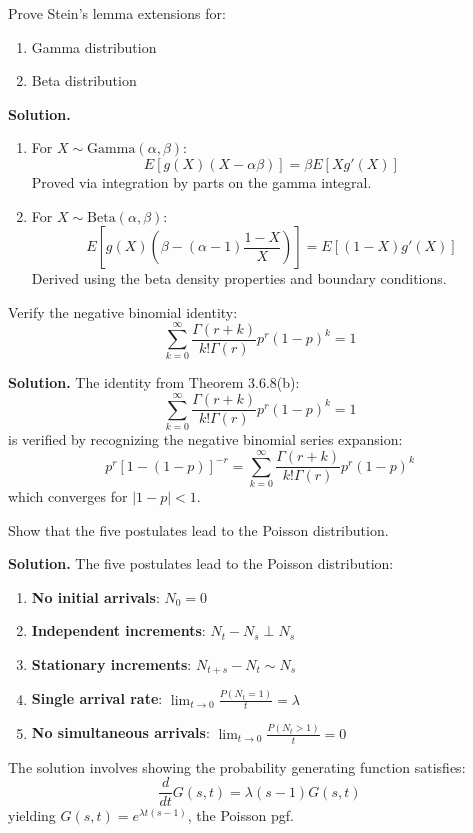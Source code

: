 \begin{problembox}
Prove Stein's lemma extensions for:
\begin{enumerate}[label=(\alph*)]
\item Gamma distribution
\item Beta distribution
\end{enumerate}
\end{problembox}

\noindent\textbf{Solution.}
\begin{enumerate}[label=(\alph*)]
\item For $X \sim \text{Gamma}(\alpha,\beta)$:
\[ E[g(X)(X-\alpha\beta)] = \beta E[Xg'(X)] \]
Proved via integration by parts on the gamma integral.

\item For $X \sim \text{Beta}(\alpha,\beta)$:
\[ E\left[g(X)\left(\beta - (\alpha-1)\frac{1-X}{X}\right)\right] = E[(1-X)g'(X)] \]
Derived using the beta density properties and boundary conditions.
\end{enumerate}

\begin{problembox}
Verify the negative binomial identity:
\[ \sum_{k=0}^\infty \frac{\Gamma(r+k)}{k!\Gamma(r)}p^r(1-p)^k = 1 \]
\end{problembox}

\noindent\textbf{Solution.}
The identity from Theorem 3.6.8(b):
\[ \sum_{k=0}^\infty \frac{\Gamma(r+k)}{k!\Gamma(r)}p^r(1-p)^k = 1 \]
is verified by recognizing the negative binomial series expansion:
\[ p^r[1-(1-p)]^{-r} = \sum_{k=0}^\infty \frac{\Gamma(r+k)}{k!\Gamma(r)}p^r(1-p)^k \]
which converges for $|1-p| < 1$.

\begin{problembox}
Show that the five postulates lead to the Poisson distribution.
\end{problembox}

\noindent\textbf{Solution.}
The five postulates lead to the Poisson distribution:
\begin{enumerate}
\item \textbf{No initial arrivals}: $N_0 = 0$
\item \textbf{Independent increments}: $N_t - N_s \perp N_s$
\item \textbf{Stationary increments}: $N_{t+s} - N_t \sim N_s$
\item \textbf{Single arrival rate}: $\lim_{t\to 0}\frac{P(N_t=1)}{t} = \lambda$
\item \textbf{No simultaneous arrivals}: $\lim_{t\to 0}\frac{P(N_t>1)}{t} = 0$
\end{enumerate}

The solution involves showing the probability generating function satisfies:
\[ \frac{d}{dt}G(s,t) = \lambda(s-1)G(s,t) \]
yielding $G(s,t) = e^{\lambda t(s-1)}$, the Poisson pgf.

